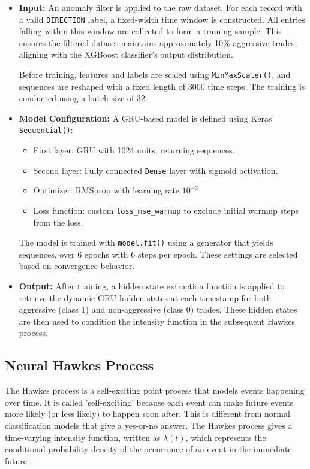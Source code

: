 \begin{itemize}
  \item \textbf{Input:}  
  An anomaly filter is applied to the raw dataset. For each record with a valid \texttt{DIRECTION} label, a fixed-width time window is constructed. All entries falling within this window are collected to form a training sample. This ensures the filtered dataset maintains approximately 10\% aggressive trades, aligning with the XGBoost classifier's output distribution.

  Before training, features and labels are scaled using \texttt{MinMaxScaler()}, and sequences are reshaped with a fixed length of 3000 time steps. The training is conducted using a batch size of 32.

  \item \textbf{Model Configuration:}  
  A GRU-based model is defined using Keras \texttt{Sequential()}:
  \begin{itemize}
    \item First layer: GRU with 1024 units, returning sequences.
    \item Second layer: Fully connected \texttt{Dense} layer with sigmoid activation.
    \item Optimizer: RMSprop with learning rate $10^{-3}$
    \item Loss function: custom \texttt{loss\_mse\_warmup} to exclude initial warmup steps from the loss.
  \end{itemize}

  The model is trained with \texttt{model.fit()} using a generator that yields sequences, over 6 epochs with 6 steps per epoch. These settings are selected based on convergence behavior.

  \item \textbf{Output:}  
  After training, a hidden state extraction function is applied to retrieve the dynamic GRU hidden states at each timestamp for both aggressive (class 1) and non-aggressive (class 0) trades. These hidden states are then used to condition the intensity function in the subsequent Hawkes process.
\end{itemize}




\subsection{Neural Hawkes Process}
The Hawkes process is a self-exciting point process that models events happening over time. It is called 'self-exciting' because each event can make future events more likely (or less likely) to happen soon after. This is different from normal classification models that give a yes-or-no answer. The Hawkes process gives a time-varying intensity function, written as $\lambda(t)$, which represents the conditional probability density of the occurrence of an event in the immediate future \citep{bacry_hawkes_2015}. 

